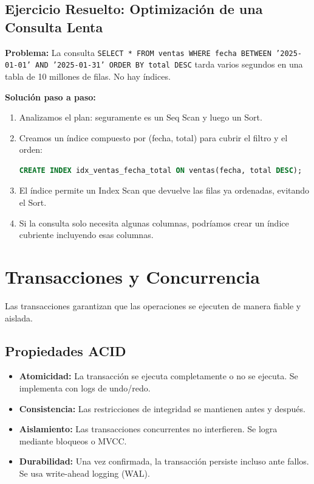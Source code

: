 \documentclass[12pt,a4paper,openany,oneside]{book}
\begin{document}
\section{Ejercicio Resuelto: Optimización de una Consulta Lenta}
\textbf{Problema:} La consulta \texttt{SELECT * FROM ventas WHERE fecha BETWEEN '2025-01-01' AND '2025-01-31' ORDER BY total DESC} tarda varios segundos en una tabla de 10 millones de filas. No hay índices.

\textbf{Solución paso a paso:}
\begin{enumerate}
    \item Analizamos el plan: seguramente es un Seq Scan y luego un Sort.
    \item Creamos un índice compuesto por (fecha, total) para cubrir el filtro y el orden:
        \begin{lstlisting}[language=SQL]
CREATE INDEX idx_ventas_fecha_total ON ventas(fecha, total DESC);
        \end{lstlisting}
    \item El índice permite un Index Scan que devuelve las filas ya ordenadas, evitando el Sort.
    \item Si la consulta solo necesita algunas columnas, podríamos crear un índice cubriente incluyendo esas columnas.
\end{enumerate}

\chapter{Transacciones y Concurrencia}
Las transacciones garantizan que las operaciones se ejecuten de manera fiable y aislada.

\section{Propiedades ACID}
\begin{itemize}
    \item \textbf{Atomicidad:} La transacción se ejecuta completamente o no se ejecuta. Se implementa con logs de undo/redo.
    \item \textbf{Consistencia:} Las restricciones de integridad se mantienen antes y después.
    \item \textbf{Aislamiento:} Las transacciones concurrentes no interfieren. Se logra mediante bloqueos o MVCC.
    \item \textbf{Durabilidad:} Una vez confirmada, la transacción persiste incluso ante fallos. Se usa write-ahead logging (WAL).
\end{itemize}
\end{document}
